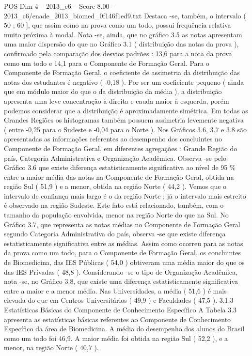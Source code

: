 \begin{textsample}{POS Dim 4 – 2013\_c6 – Score 8.00 – 2013\_c6/enade\_2013\_biomed\_0f146f1ed9.txt}
Destaca -se, também, o intervalo ( 50 ; 60 ], que assim como na prova como um todo, possui frequência relativa muito próxima à modal.
Nota -se, ainda, que no gráfico 3.5 as notas apresentam uma maior dispersão do que no Gráfico 3.1 ( distribuição das notas da prova ), confirmado pela comparação dos desvios padrões : 13,6 para a nota da prova como um todo e 14,1 para o Componente de Formação Geral.
Para o Componente de Formação Geral, o coeficiente de assimetria da distribuição das notas dos estudantes é negativo ( -0,18 ).
Por ser um coeficiente pequeno ( ainda que em módulo maior do que o da distribuição da média ), a distribuição apresenta uma leve concentração à direita e cauda maior à esquerda, porém podemos considerar que a distribuição é aproximadamente simétrica.
Em todas as Grandes Regiões os histogramas também possuem assimetria levemente negativa ( entre -0,25 para o Sudeste e -0,04 para o Norte ).
Nos Gráficos 3.6, 3.7 e 3.8 são apresentadas as informações referentes ao desempenho dos concluintes no Componente de Formação Geral, em diferentes agregações : Grande Região do país, Categoria Administrativa e Organização Acadêmica.
Observa -se pelo Gráfico 3.6 que existe diferença estatisticamente significativa ao nível de 95 \% entre a maior média das notas na Componente de Formação Geral, obtida na região Sul ( 51,9 ) e a menor, obtida na região Norte ( 44,2 ).
Vemos que o intervalo de confiança mais largo é o da região Norte ; já o intervalo mais estreito é observado na região Sudeste.
Este fato está relacionado, também, com o tamanho da população envolvida, menor na região Norte do que na Sul.
No Gráfico 3.7, que representa as notas médias no Componente de Formação Geral segundo Categoria Administrativa do país, observa -se que existe diferença estatisticamente significativa entre as médias.
Assim como ocorreu para as notas da prova como um todo, para o Componente de Formação Geral, os concluintes de Biomedicina, das IES Públicas ( 54,0 ) obtiveram uma média maior do que os das IES Privadas ( 48,8 ).
Considerando -se o tipo de Organização Acadêmica, nota -se, no Gráfico 3.8, que existe uma diferença estatisticamente significativa entre a maior e a menor média.
Nas Universidades, a média ( 51,6 ) é mais elevada do que em Centros Universitários ( 49,9 ) e Faculdades ( 47,5 ). 3.1.3 Estatísticas Básicas do Componente de Conhecimento Específico A Tabela 3.3 apresenta as estatísticas básicas referentes ao Componente de Conhecimento Específico da área de Biomedicina.
A média do desempenho dos alunos do Brasil como um todo foi 46,9.
A maior média foi obtida na região Sul ( 52,2 ), e a menor, na região Norte ( 40,7 ).

\end{textsample}
